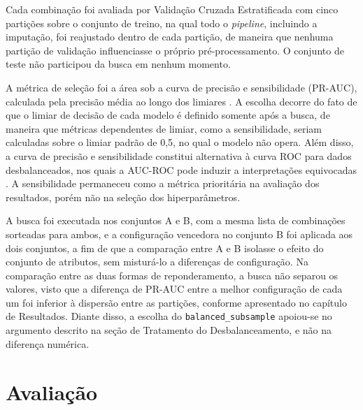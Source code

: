 Cada combinação foi avaliada por Validação Cruzada Estratificada com cinco partições sobre o conjunto de treino, na qual todo o \textit{pipeline}, incluindo a imputação, foi reajustado dentro de cada partição, de maneira que nenhuma partição de validação influenciasse o próprio pré-processamento. O conjunto de teste não participou da busca em nenhum momento.

A métrica de seleção foi a área sob a curva de precisão e sensibilidade (PR-AUC), calculada pela precisão média ao longo dos limiares \cite{Swaminathan2024}. A escolha decorre do fato de que o limiar de decisão de cada modelo é definido somente após a busca, de maneira que métricas dependentes de limiar, como a sensibilidade, seriam calculadas sobre o limiar padrão de 0,5, no qual o modelo não opera. Além disso, a curva de precisão e sensibilidade constitui alternativa à curva ROC para dados desbalanceados, nos quais a AUC-ROC pode induzir a interpretações equivocadas \cite{Swaminathan2024}. A sensibilidade permaneceu como a métrica prioritária na avaliação dos resultados, porém não na seleção dos hiperparâmetros.

A busca foi executada nos conjuntos A e B, com a mesma lista de combinações sorteadas para ambos, e a configuração vencedora no conjunto B foi aplicada aos dois conjuntos, a fim de que a comparação entre A e B isolasse o efeito do conjunto de atributos, sem misturá-lo a diferenças de configuração. Na comparação entre as duas formas de reponderamento, a busca não separou os valores, visto que a diferença de PR-AUC entre a melhor configuração de cada um foi inferior à dispersão entre as partições, conforme apresentado no capítulo de Resultados. Diante disso, a escolha do \texttt{balanced\_subsample} apoiou-se no argumento descrito na seção de Tratamento do Desbalanceamento, e não na diferença numérica.

\section{Avaliação}\label{sec:avaliacao-metodo}

